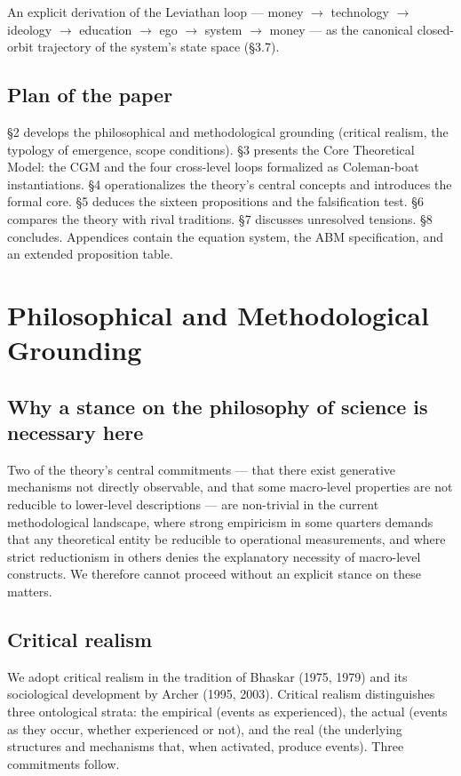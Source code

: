 \documentclass[12pt,a4paper]{article}
\begin{document}
An explicit derivation of the Leviathan loop --- money $\rightarrow$ technology $\rightarrow$ ideology $\rightarrow$ education $\rightarrow$ ego $\rightarrow$ system $\rightarrow$ money --- as the canonical closed-orbit trajectory of the system's state space (§3.7).

\subsection{Plan of the paper}

§2 develops the philosophical and methodological grounding (critical realism, the typology of emergence, scope conditions). §3 presents the Core Theoretical Model: the CGM and the four cross-level loops formalized as Coleman-boat instantiations. §4 operationalizes the theory's central concepts and introduces the formal core. §5 deduces the sixteen propositions and the falsification test. §6 compares the theory with rival traditions. §7 discusses unresolved tensions. §8 concludes. Appendices contain the equation system, the ABM specification, and an extended proposition table.



\section{Philosophical and Methodological Grounding}

\subsection{Why a stance on the philosophy of science is necessary here}

Two of the theory's central commitments --- that there exist generative mechanisms not directly observable, and that some macro-level properties are not reducible to lower-level descriptions --- are non-trivial in the current methodological landscape, where strong empiricism in some quarters demands that any theoretical entity be reducible to operational measurements, and where strict reductionism in others denies the explanatory necessity of macro-level constructs. We therefore cannot proceed without an explicit stance on these matters.

\subsection{Critical realism}

We adopt critical realism in the tradition of Bhaskar (1975, 1979) and its sociological development by Archer (1995, 2003). Critical realism distinguishes three ontological strata: the empirical (events as experienced), the actual (events as they occur, whether experienced or not), and the real (the underlying structures and mechanisms that, when activated, produce events). Three commitments follow.
\end{document}
